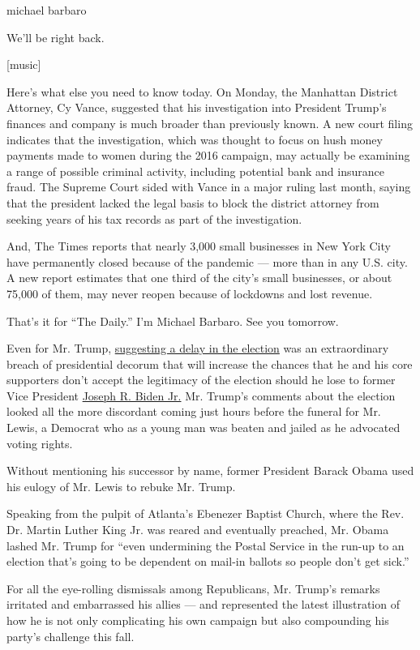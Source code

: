michael barbaro

We'll be right back.

{[}music{]}

Here's what else you need to know today. On Monday, the Manhattan
District Attorney, Cy Vance, suggested that his investigation into
President Trump's finances and company is much broader than previously
known. A new court filing indicates that the investigation, which was
thought to focus on hush money payments made to women during the 2016
campaign, may actually be examining a range of possible criminal
activity, including potential bank and insurance fraud. The Supreme
Court sided with Vance in a major ruling last month, saying that the
president lacked the legal basis to block the district attorney from
seeking years of his tax records as part of the investigation.

And, The Times reports that nearly 3,000 small businesses in New York
City have permanently closed because of the pandemic --- more than in
any U.S. city. A new report estimates that one third of the city's small
businesses, or about 75,000 of them, may never reopen because of
lockdowns and lost revenue.

That's it for ``The Daily.'' I'm Michael Barbaro. See you tomorrow.

Even for Mr. Trump,
\href{https://twitter.com/realDonaldTrump/status/1288818160389558273?s=20}{suggesting
a delay in the election} was an extraordinary breach of presidential
decorum that will increase the chances that he and his core supporters
don't accept the legitimacy of the election should he lose to former
Vice President
\href{https://www.nytimes3xbfgragh.onion/interactive/2020/us/elections/joe-biden.html}{Joseph
R. Biden Jr.} Mr. Trump's comments about the election looked all the
more discordant coming just hours before the funeral for Mr. Lewis, a
Democrat who as a young man was beaten and jailed as he advocated voting
rights.

Without mentioning his successor by name, former President Barack Obama
used his eulogy of Mr. Lewis to rebuke Mr. Trump.

Speaking from the pulpit of Atlanta's Ebenezer Baptist Church, where the
Rev. Dr. Martin Luther King Jr. was reared and eventually preached, Mr.
Obama lashed Mr. Trump for ``even undermining the Postal Service in the
run-up to an election that's going to be dependent on mail-in ballots so
people don't get sick.''

For all the eye-rolling dismissals among Republicans, Mr. Trump's
remarks irritated and embarrassed his allies --- and represented the
latest illustration of how he is not only complicating his own campaign
but also compounding his party's challenge this fall.

